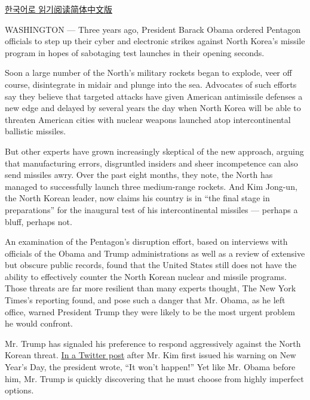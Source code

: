 \href{https://www.nytimes3xbfgragh.onion/2017/03/04/world/asia/north-korea-missile-program-sabotage-korean.html}{한국어로
읽기}\href{http://cn.nytimes3xbfgragh.onion/usa/20170304/north-korea-missile-program-sabotage/}{阅读简体中文版}

WASHINGTON --- Three years ago, President Barack Obama ordered Pentagon
officials to step up their cyber and electronic strikes against North
Korea's missile program in hopes of sabotaging test launches in their
opening seconds.

Soon a large number of the North's military rockets began to explode,
veer off course, disintegrate in midair and plunge into the sea.
Advocates of such efforts say they believe that targeted attacks have
given American antimissile defenses a new edge and delayed by several
years the day when North Korea will be able to threaten American cities
with nuclear weapons launched atop intercontinental ballistic missiles.

But other experts have grown increasingly skeptical of the new approach,
arguing that manufacturing errors, disgruntled insiders and sheer
incompetence can also send missiles awry. Over the past eight months,
they note, the North has managed to successfully launch three
medium-range rockets. And Kim Jong-un, the North Korean leader, now
claims his country is in ``the final stage in preparations'' for the
inaugural test of his intercontinental missiles --- perhaps a bluff,
perhaps not.

An examination of the Pentagon's disruption effort, based on interviews
with officials of the Obama and Trump administrations as well as a
review of extensive but obscure public records, found that the United
States still does not have the ability to effectively counter the North
Korean nuclear and missile programs. Those threats are far more
resilient than many experts thought, The New York Times's reporting
found, and pose such a danger that Mr. Obama, as he left office, warned
President Trump they were likely to be the most urgent problem he would
confront.

Mr. Trump has signaled his preference to respond aggressively against
the North Korean threat.
\href{https://www.nytimes3xbfgragh.onion/2017/01/02/world/asia/trump-twitter-north-korea-missiles-china.html?_r=0}{In
a Twitter post} after Mr. Kim first issued his warning on New Year's
Day, the president wrote, ``It won't happen!'' Yet like Mr. Obama before
him, Mr. Trump is quickly discovering that he must choose from highly
imperfect options.

